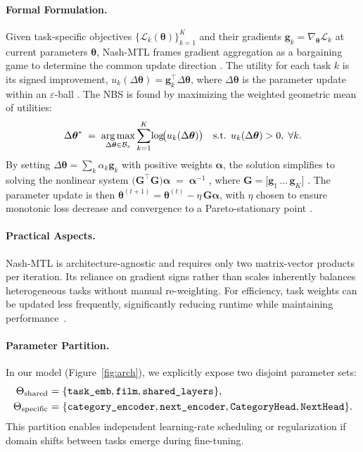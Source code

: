 \paragraph*{Formal Formulation.}
Given task-specific objectives $\{\mathcal{L}_k(\boldsymbol{\theta})\}_{k=1}^{K}$ and their gradients $\mathbf{g}_k=\nabla_{\!\boldsymbol{\theta}}\mathcal{L}_k$ at current parameters $\boldsymbol{\theta}$, Nash-MTL frames gradient aggregation as a bargaining game to determine the common update direction \cite{nash}. The utility for each task $k$ is its signed improvement, $u_k(\Delta\boldsymbol{\theta})=\mathbf{g}_k^{\!\top}\!\Delta\boldsymbol{\theta}$, where $\Delta\boldsymbol{\theta}$ is the parameter update within an $\varepsilon$-ball \cite{nash}. The NBS is found by maximizing the weighted geometric mean of utilities:
\begin{equation}
\Delta\boldsymbol{\theta}^{*}\;=\;\argmax_{\Delta\boldsymbol{\theta}\in\mathcal{B}_\varepsilon}
\sum_{k=1}^{K}\!\log\!\bigl(u_k(\Delta\boldsymbol{\theta})\bigr)
\quad\text{s.t. }u_k(\Delta\boldsymbol{\theta})>0,\;\forall k.
\label{eq:nbs_objective}
\end{equation}
By setting $\Delta\boldsymbol{\theta}=\sum_{k}\alpha_k\mathbf{g}_k$ with positive weights $\boldsymbol{\alpha}$, the solution simplifies to solving the nonlinear system $\bigl(\mathbf{G}^{\!\top}\mathbf{G}\bigr)\boldsymbol{\alpha} \;=\; \boldsymbol{\alpha}^{-1}$ \cite{nash}, where $\mathbf{G}=\bigl[\mathbf{g}_1\,\ldots\,\mathbf{g}_K\bigr]$ \cite{nash}. The parameter update is then $\boldsymbol{\theta}^{(t+1)} =\boldsymbol{\theta}^{(t)}-\eta\,\mathbf{G}\boldsymbol{\alpha}$, with $\eta$ chosen to ensure monotonic loss decrease and convergence to a Pareto-stationary point \cite{nash}.

\paragraph*{Practical Aspects.}
Nash-MTL is architecture-agnostic and requires only two matrix-vector products per iteration. Its reliance on gradient signs rather than scales inherently balances heterogeneous tasks without manual re-weighting. For efficiency, task weights can be updated less frequently, significantly reducing runtime while maintaining performance~\cite{nash}.


\paragraph*{Parameter Partition.}
In our model (Figure~\ref{fig:arch}), we explicitly expose two disjoint parameter sets:
\[
\resizebox{\linewidth}{!}{$%
  \begin{aligned}
    \Theta_{\text{shared}}   &= \{\texttt{task\_emb},\texttt{film},\texttt{shared\_layers}\},\\
    \Theta_{\text{specific}} &= \{\texttt{category\_encoder},\texttt{next\_encoder},
                                 \texttt{CategoryHead},\texttt{NextHead}\}.
  \end{aligned}
$}
\]
This partition enables independent learning-rate scheduling or regularization if domain shifts between tasks emerge during fine-tuning.

